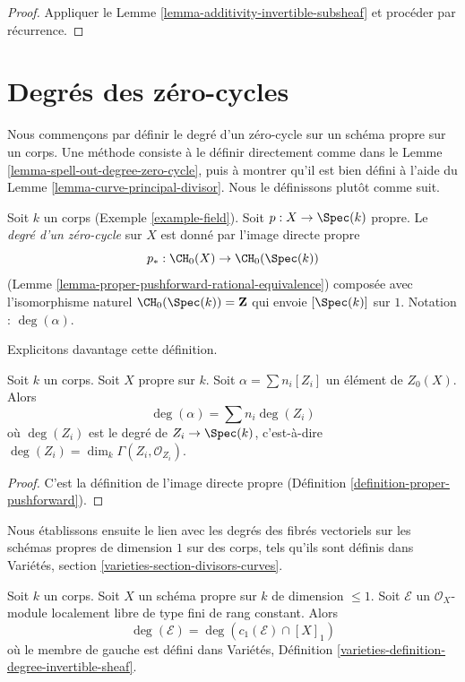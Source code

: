 \begin{proof}
Appliquer le Lemme \ref{lemma-additivity-invertible-subsheaf} et procéder par récurrence.
\end{proof}




\section{Degrés des zéro-cycles}
\label{section-degree-zero-cycles}

\noindent
Nous commençons par définir le degré d'un zéro-cycle sur un schéma propre sur un corps.
Une méthode consiste à le définir directement comme dans le
Lemme \ref{lemma-spell-out-degree-zero-cycle}, puis à montrer
qu'il est bien défini à l'aide du
Lemme \ref{lemma-curve-principal-divisor}.
Nous le définissons plutôt comme suit.

\begin{definition}
\label{definition-degree-zero-cycle}
Soit $k$ un corps (Exemple \ref{example-field}). Soit $p : X \to \Spec(k)$
propre. Le {\it degré d'un zéro-cycle} sur $X$ est donné par l'image
directe propre
$$
p_* : \CH_0(X) \to \CH_0(\Spec(k))
$$
(Lemme \ref{lemma-proper-pushforward-rational-equivalence})
composée avec l'isomorphisme naturel $\CH_0(\Spec(k)) = \mathbf{Z}$
qui envoie $[\Spec(k)]$ sur $1$. Notation : $\deg(\alpha)$.
\end{definition}

\noindent
Explicitons davantage cette définition.

\begin{lemma}
\label{lemma-spell-out-degree-zero-cycle}
Soit $k$ un corps. Soit $X$ propre sur $k$. Soit $\alpha = \sum n_i[Z_i]$
un élément de $Z_0(X)$. Alors
$$
\deg(\alpha) = \sum n_i\deg(Z_i)
$$
où $\deg(Z_i)$ est le degré de $Z_i \to \Spec(k)$, c'est-à-dire
$\deg(Z_i) = \dim_k \Gamma(Z_i, \mathcal{O}_{Z_i})$.
\end{lemma}

\begin{proof}
C'est la définition de l'image directe propre
(Définition \ref{definition-proper-pushforward}).
\end{proof}

\noindent
Nous établissons ensuite le lien avec les degrés des fibrés vectoriels
sur les schémas propres de dimension $1$ sur des corps, tels qu'ils sont définis dans
Variétés, section \ref{varieties-section-divisors-curves}.

\begin{lemma}
\label{lemma-degree-vector-bundle}
Soit $k$ un corps. Soit $X$ un schéma propre sur $k$ de dimension $\leq 1$.
Soit $\mathcal{E}$ un $\mathcal{O}_X$-module localement libre de type fini de
rang constant. Alors
$$
\deg(\mathcal{E}) = \deg(c_1(\mathcal{E}) \cap [X]_1)
$$
où le membre de gauche est défini dans
Variétés, Définition \ref{varieties-definition-degree-invertible-sheaf}.
\end{lemma}

